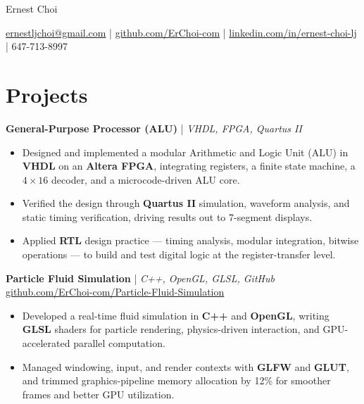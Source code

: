 \documentclass[11pt]{article}
\begin{document}
\centerline{\Huge Ernest Choi}
\vspace{3pt}

\centerline{%
  \href{mailto:ernestljchoi@gmail.com}{ernestljchoi@gmail.com} |
  \href{https://www.github.com/ErChoi-com}{github.com/ErChoi-com} |
  \href{https://www.linkedin.com/in/ernest-choi-lj}{linkedin.com/in/ernest-choi-lj} |
  647-713-8997
}


\section*{Projects}

\textbf{General-Purpose Processor (ALU)} | \textit{VHDL, FPGA, Quartus II} \\ %
\begin{itemize}
  \item Designed and implemented a modular Arithmetic and Logic Unit (ALU) in \textbf{VHDL} on an \textbf{Altera FPGA}, integrating registers, a finite state machine, a $4\times16$ decoder, and a microcode-driven ALU core.
  \item Verified the design through \textbf{Quartus II} simulation, waveform analysis, and static timing verification, driving results out to 7-segment displays.
  \item Applied \textbf{RTL} design practice — timing analysis, modular integration, bitwise operations — to build and test digital logic at the register-transfer level.
\end{itemize}

\textbf{Particle Fluid Simulation} | \textit{C++, OpenGL, GLSL, GitHub} \hfill \href{https://github.com/ErChoi-com/Particle-Fluid-Simulation}{github.com/ErChoi-com/Particle-Fluid-Simulation} \\
\begin{itemize}
  \item Developed a real-time fluid simulation in \textbf{C++} and \textbf{OpenGL}, writing \textbf{GLSL} shaders for particle rendering, physics-driven interaction, and GPU-accelerated parallel computation.
  \item Managed windowing, input, and render contexts with \textbf{GLFW} and \textbf{GLUT}, and trimmed graphics-pipeline memory allocation by 12\% for smoother frames and better GPU utilization.
\end{itemize}
\end{document}
